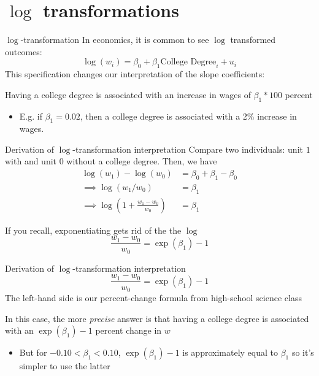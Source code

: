 \documentclass[aspectratio=169,t,11pt,table]{beamer}
\begin{document}
\section{\texorpdfstring{$\log$}{log} transformations}

\begin{frame}{$\log$-transformation}
  In economics, it is common to see $\log$ transformed outcomes: 
  $$
    \log(w_i) = \beta_0 + \beta_1 \text{College Degree}_i + u_i
  $$
  \pause
  This specification changes our interpretation of the slope coefficients:

  \bigskip
  Having a college degree is associated with an increase in wages of $\beta_1 * 100$ percent
  \begin{itemize}
    \item E.g. if $\beta_1 = 0.02$, then a college degree is associated with a 2\% increase in wages.
  \end{itemize}
\end{frame}

\begin{frame}{Derivation of $\log$-transformation interpretation}
  Compare two individuals: unit $1$ with and unit $0$ without a college degree. Then, we have 
  \begin{align*}
    \log(w_1) - \log(w_0) &= \beta_0 + \beta_1 - \beta_0 \\
    \implies \log(w_1 / w_0) &= \beta_1 \\
    \implies \log(1 + \frac{w_1 - w_0}{w_0}) &= \beta_1
  \end{align*}

  \pause
  \bigskip
  If you recall, exponentiating gets rid of the the $\log$
  $$
    \frac{w_1 - w_0}{w_0} = \exp(\beta_1) - 1
  $$
\end{frame}

\begin{frame}{Derivation of $\log$-transformation interpretation}
  \vspace*{-\bigskipamount}
  $$
    \frac{w_1 - w_0}{w_0} = \exp(\beta_1) - 1
  $$
  The left-hand side is our percent-change formula from high-school science class

  \pause
  \bigskip
  In this case, the more \emph{precise} answer is that having a college degree is associated with an $\exp(\beta_1) - 1$ percent change in $w$
  \begin{itemize}
    \item But for $-0.10 < \beta_1 < 0.10$, $\exp(\beta_1) - 1$ is approximately equal to $\beta_1$ so it's simpler to use the latter
  \end{itemize}
\end{frame}
\end{document}
